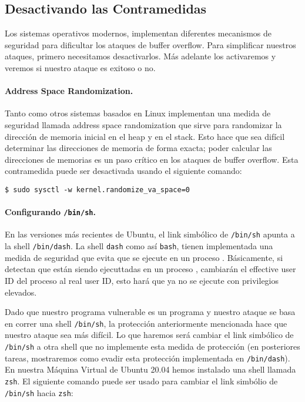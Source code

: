 \subsection{Desactivando las Contramedidas}

Los sistemas operativos modernos, implementan diferentes mecanismos de seguridad para dificultar los ataques de buffer overflow.
Para simplificar nuestros ataques, primero necesitamos desactivarlos.
Más adelante los activaremos y veremos si nuestro ataque es exitoso o no.


\paragraph{Address Space Randomization.}
Tanto \ubuntu como otros sistemas basados en Linux implementan una medida de seguridad llamada address space randomization que sirve para randomizar la dirección de memoria inicial en el heap y en el stack. Esto hace que sea difícil determinar las direcciones de memoria de forma exacta; poder calcular las direcciones de memorias es un paso crítico en los ataques de buffer overflow.
Esta contramedida puede ser desactivada usando el siguiente comando:

\begin{lstlisting}
$ sudo sysctl -w kernel.randomize_va_space=0
\end{lstlisting}


\paragraph{Configurando \texttt{/bin/sh}.} En las versiones más recientes de Ubuntu, el link simbólico de \texttt{/bin/sh} apunta a la shell \texttt{/bin/dash}. La shell \texttt{dash} como así \texttt{bash}, tienen implementada una medida de seguridad que evita que se ejecute en un proceso \setuid. Básicamente, si detectan que están siendo ejecuttadas en un proceso \setuid, cambiarán el effective user ID del proceso al real user ID, esto hará que ya no se ejecute con privilegios elevados.


Dado que nuestro programa vulnerable es un programa \setuid y nuestro ataque se basa en correr una shell \texttt{/bin/sh}, la protección anteriormente mencionada hace que nuestro ataque sea más difícil. Lo que haremos será cambiar el link simbólico de \texttt{/bin/sh} a otra shell que no implemente esta medida de protección (en posteriores tareas, mostraremos como evadir esta protección implementada en \texttt{/bin/dash}). En nuestra Máquina Virtual de Ubuntu 20.04 hemos instalado una shell llamada \texttt{zsh}. El siguiente comando puede ser usado para cambiar el link simbólio de \texttt{/bin/sh} hacia \texttt{zsh}:

